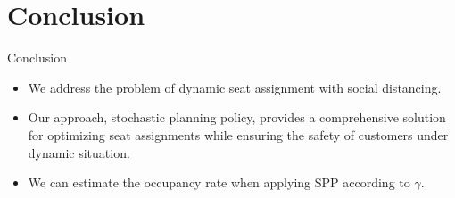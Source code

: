 
\section{Conclusion}
\frame{\sectionpage}

\begin{frame}{Conclusion}
    \begin{itemize}
        \item We address the problem of dynamic seat assignment with social distancing.
        
        \item Our approach, stochastic planning policy, provides a comprehensive solution for optimizing seat assignments while ensuring the safety of customers under dynamic situation.
        
        \item We can estimate the occupancy rate when applying SPP according to $\gamma$.
    \end{itemize}
\end{frame}
